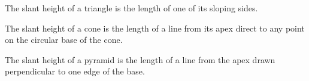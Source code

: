 The slant height of a triangle is the length of one of its sloping sides.
\par
The slant height of a cone is the length of a line from its apex direct 
to any point on the circular base of the cone.
\par
The slant height of a pyramid is the length of a line from the apex 
drawn perpendicular to one edge of the base.